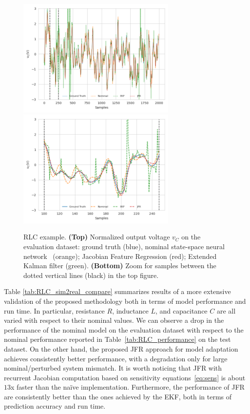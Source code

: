 \documentclass{article}
\begin{document}

\begin{figure}[ht]
    \centering
\includegraphics[width=0.70\textwidth]{figures/RLC_JFR.png}\\
\includegraphics[width=0.70\textwidth]{figures/RLC_JFR_zoomed.png}
    \caption{RLC example. \textbf{(Top)} Normalized output voltage $v_C$ on the evaluation dataset: ground truth (blue), nominal state-space neural network~\cite{forgione2021continuous} (orange); Jacobian Feature Regression (red); Extended Kalman filter (green).
    \textbf{(Bottom)} Zoom for samples between the dotted vertical lines (black) in the top figure.}
    \label{RLC-prediction-compare-zoom}
\end{figure}

Table \ref{tab:RLC_sim2real_compare} summarizes results of a more extensive validation of the proposed methodology  both in terms of model performance and run time. In particular,  resistance $R$, inductance $L$, and capacitance $C$ are all varied with respect to their nominal values.    
We can observe a drop in the performance of the nominal model on the evaluation dataset with respect to the nominal  performance reported in Table~\ref{tab:RLC_performance} on the test dataset. On the other hand, the proposed  JFR approach for model adaptation achieves consistently better performance, with a  degradation only for large nominal/perturbed system mismatch. It is worth noticing that JFR with recurrent Jacobian computation based on sensitivity equations~\eqref{eq:sens} is about $13$x faster than the na{\"i}ve implementation. 
Furthermore, the performance of JFR are consistently better than the ones achieved by the EKF, both in terms of prediction accuracy and run time. 
\end{document}
